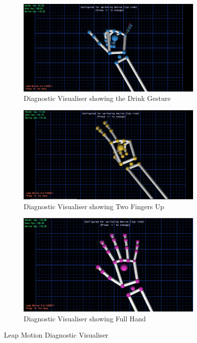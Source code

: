 \documentclass{l4proj}
\begin{document}
\begin{figure}[!htb]
    \centering
    \begin{subfigure}[b]{0.45\textwidth}
        \includegraphics[scale = 0.22]{images/drinkGesture.png}
        \caption{Diagnostic Visualiser showing the Drink Gesture}
        \label{fig:drinkGesture}
    \end{subfigure}
    \begin{subfigure}[b]{0.45\textwidth}
        \includegraphics[scale = 0.22]{images/twoFingers.png}
        \caption{Diagnostic Visualiser showing Two Fingers Up}
        \label{fig:twoFingers}
    \end{subfigure}
    \begin{subfigure}[b]{0.45\textwidth}
        \includegraphics[scale = 0.22]{images/fullHand.png}
        \caption{Diagnostic Visualiser showing Full Hand}
        \label{fig:fullHand}
    \end{subfigure}
    \caption{Leap Motion Diagnostic Visualiser}
    \label{fig:diagnosticVisualiser}
\end{figure}
\end{document}
